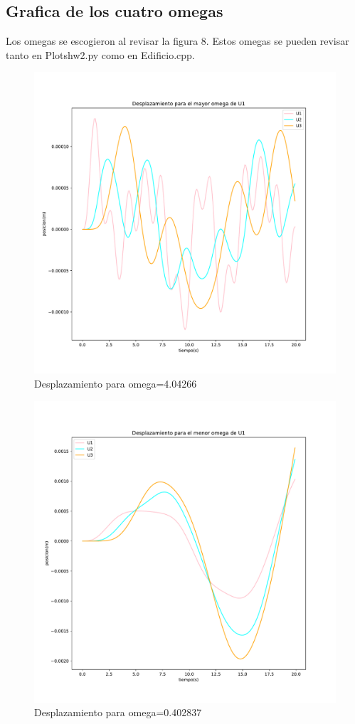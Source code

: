 \documentclass[11pt,letterpaper]{exam}
\begin{document}
\subsection{Grafica de los cuatro omegas}
Los omegas se escogieron al revisar la figura 8.
Estos omegas se pueden revisar tanto en Plotshw2.py como en Edificio.cpp. 
\begin{figure}[H]
    \centering
    \includegraphics[width=1\textwidth]{plot_omega1.pdf}
    \caption{ Desplazamiento para omega=4.04266}
    \label{fig:my_label}
\end{figure}

\begin{figure}[H]
    \centering
    \includegraphics[width=1\textwidth]{plot_omega2.pdf}
    \caption{ Desplazamiento para omega=0.402837}
    \label{fig:my_label}
\end{figure}
\end{document}
